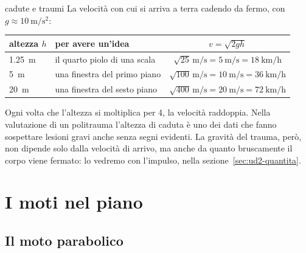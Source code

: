\begin{applicazione}{cadute e traumi}
La velocità con cui si arriva a terra cadendo da fermo, con $g \approx \SI{10}{\metre\per\second\squared}$:
\begin{center}
\small
\begin{tabular}{@{}llc@{}}
\toprule
altezza $h$ & per avere un'idea & $v = \sqrt{2gh}$ \\
\midrule
\SI{1,25}{\metre} & il quarto piolo di una scala & $\sqrt{25}\,\si{\metre\per\second} = \SI{5}{\metre\per\second} = \SI{18}{\kilo\metre\per\hour}$ \\
\SI{5}{\metre} & una finestra del primo piano & $\sqrt{100}\,\si{\metre\per\second} = \SI{10}{\metre\per\second} = \SI{36}{\kilo\metre\per\hour}$ \\
\SI{20}{\metre} & una finestra del sesto piano & $\sqrt{400}\,\si{\metre\per\second} = \SI{20}{\metre\per\second} = \SI{72}{\kilo\metre\per\hour}$ \\
\bottomrule
\end{tabular}
\end{center}
Ogni volta che l'altezza si moltiplica per 4, la velocità raddoppia. Nella valutazione di un politrauma l'altezza di caduta è uno dei dati che fanno sospettare lesioni gravi anche senza segni evidenti. La gravità del trauma, però, non dipende solo dalla velocità di arrivo, ma anche da quanto bruscamente il corpo viene fermato: lo vedremo con l'impulso, nella sezione~\ref{sec:ud2-quantita}.
\end{applicazione}



\section{I moti nel piano}
\label{sec:ud2-piano}

\subsection{Il moto parabolico}

